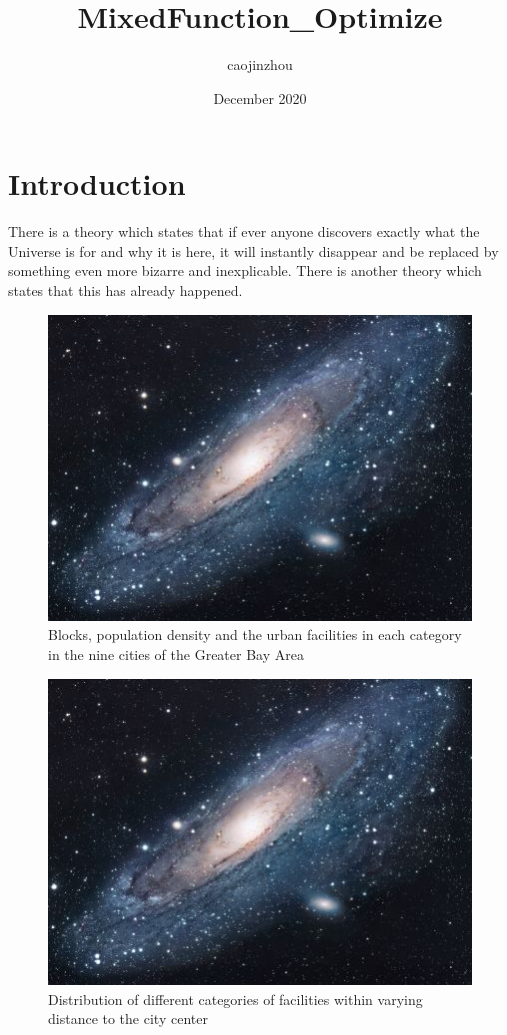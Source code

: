 \documentclass{article}
\title{MixedFunction_Optimize}
\author{caojinzhou }
\date{December 2020}
\begin{document}
\maketitle

\section{Introduction}
There is a theory which states that if ever anyone discovers exactly what the Universe is for and why it is here, it will instantly disappear and be replaced by something even more bizarre and inexplicable.
There is another theory which states that this has already happened.

\begin{figure}[h!]
\centering
\includegraphics[scale=1.7]{universe}
\caption{Blocks, population density and the urban facilities in each category in the nine cities of the Greater Bay Area}
\label{fig:universe}
\end{figure}

\begin{figure}[h!]
\centering
\includegraphics[scale=1.7]{universe}
\caption{Distribution of different categories of facilities within varying distance to the city center}
\label{fig:universe}
\end{figure}
\end{document}

